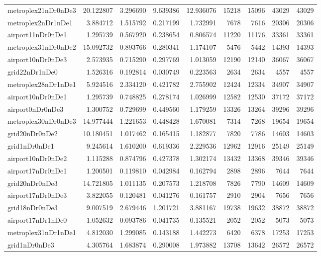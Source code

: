 \begin{longtable}{|l|r|r|r|r|r|r|r|r|}
metroplex21nDr0nDe3 & 20.122807 & 3.296690 & 9.639386 & 12.936076 & 15218 & 15096 & 43029 & 43029 \\
metroplex2nDr1nDe1 & 3.884712 & 1.515792 & 0.217199 & 1.732991 & 7678 & 7616 & 20306 & 20306 \\
airport11nDr0nDe1 & 1.295739 & 0.567920 & 0.238654 & 0.806574 & 11220 & 11176 & 33361 & 33361 \\
metroplex31nDr0nDe2 & 15.092732 & 0.893766 & 0.280341 & 1.174107 & 5476 & 5442 & 14393 & 14393 \\
airport10nDr0nDe3 & 2.573935 & 0.715290 & 0.297769 & 1.013059 & 12190 & 12140 & 36067 & 36067 \\
grid22nDr1nDe0 & 1.526316 & 0.192814 & 0.030749 & 0.223563 & 2634 & 2634 & 4557 & 4557 \\
metroplex28nDr1nDe1 & 5.924516 & 2.334120 & 0.421782 & 2.755902 & 12424 & 12334 & 34907 & 34907 \\
airport10nDr0nDe1 & 1.295739 & 0.748825 & 0.278174 & 1.026999 & 12582 & 12530 & 37172 & 37172 \\
airport0nDr0nDe3 & 1.300752 & 0.729699 & 0.449560 & 1.179259 & 13326 & 13264 & 39296 & 39296 \\
metroplex30nDr0nDe3 & 14.977444 & 1.221653 & 0.448428 & 1.670081 & 7314 & 7268 & 19654 & 19654 \\
grid20nDr0nDe2 & 10.180451 & 1.017462 & 0.165415 & 1.182877 & 7820 & 7786 & 14603 & 14603 \\
grid1nDr0nDe1 & 9.245614 & 1.610200 & 0.619336 & 2.229536 & 12962 & 12916 & 25149 & 25149 \\
airport10nDr0nDe2 & 1.115288 & 0.874796 & 0.427378 & 1.302174 & 13432 & 13368 & 39346 & 39346 \\
airport17nDr0nDe1 & 1.200501 & 0.119810 & 0.042984 & 0.162794 & 2898 & 2896 & 7644 & 7644 \\
grid20nDr0nDe3 & 14.721805 & 1.011135 & 0.207573 & 1.218708 & 7826 & 7790 & 14609 & 14609 \\
airport17nDr0nDe3 & 3.822055 & 0.120481 & 0.041276 & 0.161757 & 2910 & 2904 & 7656 & 7656 \\
grid18nDr0nDe3 & 9.007519 & 2.679446 & 1.201721 & 3.881167 & 19738 & 19632 & 38872 & 38872 \\
airport17nDr1nDe0 & 1.052632 & 0.093786 & 0.041735 & 0.135521 & 2052 & 2052 & 5073 & 5073 \\
metroplex31nDr1nDe1 & 4.812030 & 1.299085 & 0.143188 & 1.442273 & 6420 & 6378 & 17253 & 17253 \\
grid1nDr0nDe3 & 4.305764 & 1.683874 & 0.290008 & 1.973882 & 13708 & 13642 & 26572 & 26572 \\

\end{longtable}
